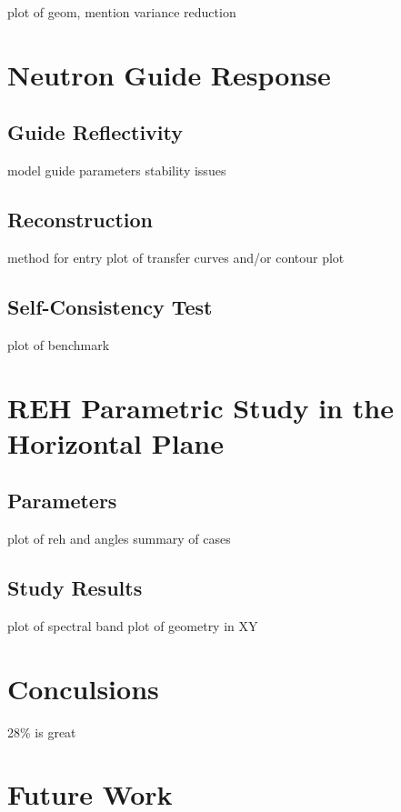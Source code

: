 \documentclass[a4paper]{jpconf}
\begin{document}
plot of geom, mention variance reduction

\section{Neutron Guide Response} 


\subsection{Guide Reflectivity}

model
guide parameters
stability issues

\cite{mcnpx_reflectivity}


\subsection{Reconstruction}

method for entry
plot of transfer curves and/or contour plot


\subsection{Self-Consistency Test}

plot of benchmark

\section{REH Parametric Study in the Horizontal Plane}


\subsection{Parameters}

plot of reh and angles
summary of cases


\subsection{Study Results}

plot of spectral band
plot of geometry in XY


\section{Conculsions}

28\% is great



\section{Future Work}
\end{document}
